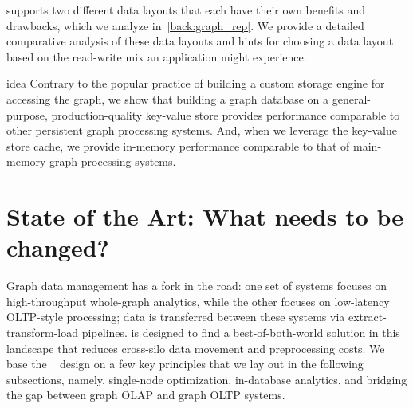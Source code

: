 \project{} supports two different data layouts that each have their own benefits and drawbacks, which we analyze in~\autoref{back:graph_rep}. 
We provide a detailed comparative analysis of these data layouts and hints for choosing a data layout based on the read-write mix an application might experience.

\begin{statusbar}{idea}
Contrary to the popular practice of building a custom storage engine for accessing the graph, we show that building a graph database on a general-purpose, production-quality key-value store provides performance comparable to other persistent graph processing systems.  
And, when we leverage the key-value store cache, we provide in-memory performance comparable to that of main-memory graph processing systems.
\end{statusbar}

\section{State of the Art: What needs to be changed?}
\label{intro:what_change}
Graph data management has a fork in the road: one set of systems focuses on high-throughput whole-graph analytics, while the other focuses on low-latency OLTP-style processing; data is transferred between these systems via extract-transform-load pipelines.
\project{} is designed to find a best-of-both-world solution in this landscape that reduces cross-silo data movement and preprocessing costs. 
We base the ~\project{} design on a few key principles that we lay out in the following subsections, namely, single-node optimization, in-database analytics, and bridging the gap between graph OLAP and graph OLTP systems.

